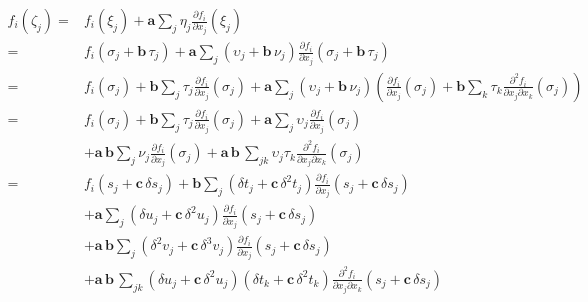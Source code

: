 \begin{align*}
f_{i} \! \left( \zeta_{j} \right)
%
=&
f_{i} \! \left( \xi_{j} \right) 
+ \mathbf{a} \sum_{j} \eta_{j} \frac{ \partial f_{i} }{ \partial x_{j} } \! \left( \xi_{j} \right) 
\\
%
=&
f_{i} \! \left( \sigma_{j} + \mathbf{b} \, \tau_{j} \right) 
+ \mathbf{a} \sum_{j} \left( \upsilon_{j} + \mathbf{b} \, \nu_{j} \right)
\frac{ \partial f_{i} }{ \partial x_{j} } 
\! \left( \sigma_{j} + \mathbf{b} \, \tau_{j} \right) 
\\
%
=&
f_{i} \! \left( \sigma_{j} \right) + \mathbf{b} 
\sum_{j} \tau_{j} \frac{ \partial f_{i} }{ \partial x_{j} } 
\! \left( \sigma_{j} \right)
+ \mathbf{a} \sum_{j} \left( \upsilon_{j} + \mathbf{b} \, \nu_{j} \right)
\left( \frac{ \partial f_{i} }{ \partial x_{j} } \! \left( \sigma_{j} \right)
+ \mathbf{b} \sum_{k} \tau_{k}
\frac{ \partial^{2} f_{i} }{ \partial x_{j} \partial x_{k} } \! \left( \sigma_{j} \right) \right) 
\\
%
=&
f_{i} \! \left( \sigma_{j} \right) + \mathbf{b} 
\sum_{j} \tau_{j} \frac{ \partial f_{i} }{ \partial x_{j} } 
\! \left( \sigma_{j} \right)
+ \mathbf{a} \sum_{j}
\upsilon_{j} \frac{ \partial f_{i} }{ \partial x_{j} } \! \left( \sigma_{j} \right)
\\
& + \mathbf{a} \, \mathbf{b} \sum_{j}
 \nu_{j} \frac{ \partial f_{i} }{ \partial x_{j} } \! \left( \sigma_{j} \right)
+ \mathbf{a} \, \mathbf{b} \, \sum_{jk} \upsilon_{j} \tau_{k}
\frac{ \partial^{2} f_{i} }{ \partial x_{j} \partial x_{k} } \! \left( \sigma_{j} \right)
\\
%
=&
f_{i} \! \left( s_{j} + \mathbf{c} \, \delta s_{j} \right) + \mathbf{b} 
\sum_{j} \left( \delta t_{j} + \mathbf{c} \, \delta^{2} t_{j} \right) 
\frac{ \partial f_{i} }{ \partial x_{j} } \! \left( s_{j} + \mathbf{c} \, \delta s_{j} \right)
\\
&+ 
\mathbf{a} \sum_{j}
\left( \delta u_{j} + \mathbf{c} \, \delta^{2} u_{j} \right) 
\frac{ \partial f_{i} }{ \partial x_{j} } \! \left( s_{j} + \mathbf{c} \, \delta s_{j} \right)
\\
& + \mathbf{a} \, \mathbf{b} \sum_{j}
\left( \delta^{2} v_{j} + \mathbf{c} \, \delta^{3} v_{j} \right) \frac{ \partial f_{i} }{ \partial x_{j} } \! \left( s_{j} + \mathbf{c} \, \delta s_{j} \right)
\\
&+ 
\mathbf{a} \, \mathbf{b} \, \sum_{jk} 
\left( \delta u_{j} + \mathbf{c} \, \delta^{2} u_{j} \right) 
\left( \delta t_{k} + \mathbf{c} \, \delta^{2} t_{k} \right)
\frac{ \partial^{2} f_{i} }{ \partial x_{j} \partial x_{k} } \! \left( s_{j} + \mathbf{c} \, \delta s_{j} \right)

\end{align*}
